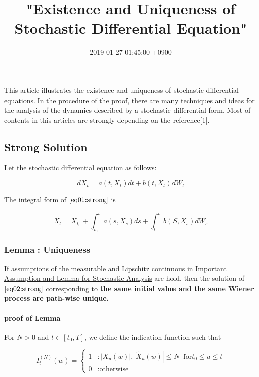 \documentclass[]{article}
\title{"Existence and Uniqueness of Stochastic Differential Equation"}
\date{2019-01-27 01:45:00 +0900}
\let\oldparagraph\paragraph
\renewcommand{\paragraph}[1]{\oldparagraph{#1}\mbox{}}
\begin{document}
\maketitle

\tableofcontents

This article illustrates the existence and uniqueness of stochastic
differential equations. In the procedure of the proof, there are many
techniques and ideas for the analysis of the dynamics described by a
stochastic differential form. Most of contents in this articles are
strongly depending on the reference{[}1{]}.

\hypertarget{header-n4}{%
\subsection{Strong Solution}\label{header-n4}}

Let the stochastic differential equation as follows:

\[dX_t = a(t, X_t) dt + b(t, X_t)dW_t
\label{eq01:strong}
\tag{1}\]

The integral form of \(\eqref{eq01:strong}\) is

\[X_t = X_{t_0} + \int_{t_0}^t a(s, X_s)ds + \int_{t_0}^t b(S, X_s) dW_s
\label{eq02:strong}
\tag{2}\]

\hypertarget{header-n9}{%
\subsubsection{Lemma : Uniqueness}\label{header-n9}}

If assumptions of the measurable and Lipschitz continuous in
\href{https://jinwuk.github.io/mathematics/stochastic\%20calculus/2018/11/25/Stochastic-Calculus-Important_Assumption_and_Lemma.html\#borel-cantelli-lemma}{Important
Assumption and Lemma for Stochastic Analysis} are hold, then the
solution of \(\eqref{eq02:strong}\) corresponding to \textbf{the same
initial value and the same Wiener process are path-wise unique.}

\hypertarget{header-n11}{%
\paragraph{proof of Lemma}\label{header-n11}}

For \(N>0\) and \(t \in [t_0, T]\), we define the indication function
such that

\[I_t^{(N)}(w) = 
\begin{cases}
1 &: |X_u(w)|, |\tilde{X}_u(w)| \leq N \;\; \text{for} t_0 \leq u \leq t \\
0 &: \text{otherwise}
\end{cases}
\tag{3}\]
\end{document}
